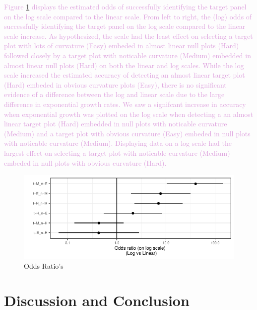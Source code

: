 \documentclass[]{interact}
\theoremstyle{plain}%
\theoremstyle{definition}
\theoremstyle{remark}
\begin{document}
\textcolor{Plum}{
Figure \ref{fig:odds-ratio-plot} displays the estimated odds of successfully identifying the target panel on the log scale compared to the linear scale. 
From left to right, the (log) odds of successfully identifying the target panel on the log scale compared to the linear scale increase. 
As hypothesized, the scale had the least effect on selecting a target plot with lots of curvature (Easy) embeded in almost linear null plots (Hard) followed closely by a target plot with noticable curvature (Medium) embedded in almost linear null plots (Hard) on both the linear and log scales. 
While the log scale increased the estimated accuracy of detecting an almost linear target plot (Hard) embeded in obvious curvature plots (Easy), there is no significant evidence of a difference between the log and linear scale due to the large difference in exponential growth rates. 
We saw a signifcant increase in accuracy when exponential growth was plotted on the log scale when detecting a an almost linear target plot (Hard) embedded in null plots with noticable curvature (Medium) and a target plot with obvious curvature (Easy) embeded in null plots with noticable curvature (Medium). 
Displaying data on a log scale had the largest effect on selecting a target plot with noticable curvature (Medium) embeded in null plots with obvious curvature (Hard).
}
\begin{figure}

{\centering \includegraphics{jsm-2021-student-paper-submission_files/figure-latex/odds-ratio-plot-1} 

}

\caption{Odds Ratio's}\label{fig:odds-ratio-plot}
\end{figure}

\hypertarget{discussion-and-conclusion}{%
\section{Discussion and Conclusion}\label{discussion-and-conclusion}}
\end{document}
